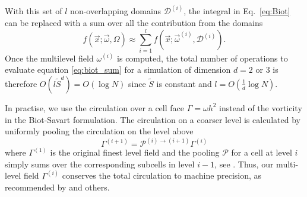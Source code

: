 \documentclass[preprint,12pt]{elsarticle}
\begin{document}

With this set of $l$ non-overlapping domains $\mathcal{D}^{(i)}$, the integral in Eq.~\ref{eq:Biot} can be replaced with a sum over all the contribution from the domains
\begin{equation}\label{eq:biot_sum}
    f(\vec{x}; \vec{\omega},\Omega) \approx \sum_{i=1}^{l} f(\vec{x}; \vec \omega^{(i)},\mathcal{D}^{(i)}).
\end{equation}
Once the multilevel field $\omega^{(i)}$ is computed, the total number of operations to evaluate equation \ref{eq:biot_sum} for a simulation of dimension $d=2$ or $3$ is therefore $O(l \tilde S^d)=O(\log N)$ since $\tilde S$ is constant and $l=O(\frac 1 d \log N)$. 


In practise, we use the circulation over a cell face $\Gamma=\omega h^2$ instead of the vorticity in the Biot-Savart formulation. The circulation on a coarser level is calculated by uniformly pooling the circulation on the level above 
\begin{equation}
\Gamma^{(i+1)}=\mathcal{P}^{(i)\to(i+1)}\Gamma^{(i)}
\end{equation}
where $\Gamma^{(1)}$ is the original finest level field and the pooling $\mathcal{P}$ for a cell at level $i$ simply sums over the corresponding subcells in level $i-1$, see \cite{Weymouth2022Data-drivenProjection}. Thus, our multi-level field $\Gamma^{(i)}$ conserves the total circulation to machine precision, as recommended by  \cite{Colonius2008} and others.
\end{document}
